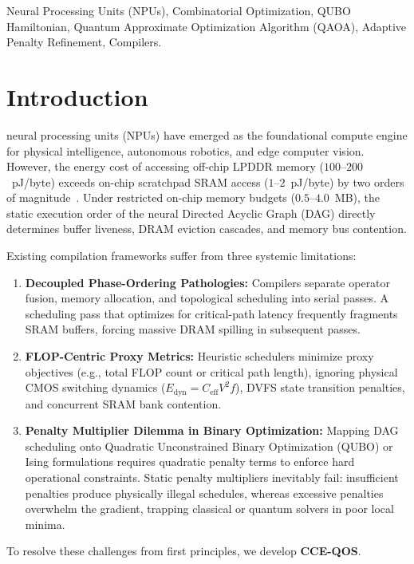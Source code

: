 \documentclass[journal]{IEEEtran}
\theoremstyle{definition}
\begin{document}
\begin{IEEEkeywords}
Neural Processing Units (NPUs), Combinatorial Optimization, QUBO Hamiltonian, Quantum Approximate Optimization Algorithm (QAOA), Adaptive Penalty Refinement, Compilers.
\end{IEEEkeywords}

\section{Introduction}
 neural processing units (NPUs) have emerged as the foundational compute engine for physical intelligence, autonomous robotics, and edge computer vision. However, the energy cost of accessing off-chip LPDDR memory ($100\text{--}200$~pJ/byte) exceeds on-chip scratchpad SRAM access ($1\text{--}2$~pJ/byte) by two orders of magnitude~\cite{chen2018,horowitz2014}. Under restricted on-chip memory budgets ($0.5\text{--}4.0$~MB), the static execution order of the neural Directed Acyclic Graph (DAG) directly determines buffer liveness, DRAM eviction cascades, and memory bus contention.

Existing compilation frameworks suffer from three systemic limitations:
\begin{enumerate}
    \item \textbf{Decoupled Phase-Ordering Pathologies:} Compilers separate operator fusion, memory allocation, and topological scheduling into serial passes. A scheduling pass that optimizes for critical-path latency frequently fragments SRAM buffers, forcing massive DRAM spilling in subsequent passes.
    \item \textbf{FLOP-Centric Proxy Metrics:} Heuristic schedulers minimize proxy objectives (e.g., total FLOP count or critical path length), ignoring physical CMOS switching dynamics ($E_{\text{dyn}} = C_{\text{eff}} V^2 f$), DVFS state transition penalties, and concurrent SRAM bank contention.
    \item \textbf{Penalty Multiplier Dilemma in Binary Optimization:} Mapping DAG scheduling onto Quadratic Unconstrained Binary Optimization (QUBO) or Ising formulations requires quadratic penalty terms to enforce hard operational constraints. Static penalty multipliers inevitably fail: insufficient penalties produce physically illegal schedules, whereas excessive penalties overwhelm the gradient, trapping classical or quantum solvers in poor local minima.
\end{enumerate}

To resolve these challenges from first principles, we develop \textbf{CCE-QOS}.
\end{document}
